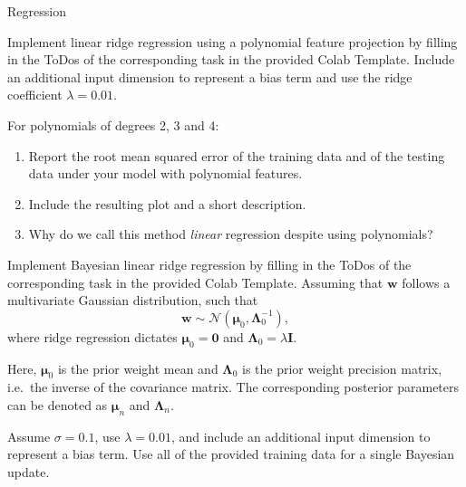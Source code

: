 \documentclass[
	english,
        solution=true
	]{tudaexercise}
\begin{document}
\begin{task}[points=34]{Regression}
\begin{subtask}[points=8, title=Linear Features]
\begin{solution}

\end{solution}

\end{subtask}

\begin{subtask}[points=8, title=Polynomial Features]
Implement linear ridge regression using a polynomial feature projection by filling in the ToDos of the corresponding task in the provided Colab Template.
Include an additional input dimension to represent a bias term and use the ridge coefficient $\lambda = 0.01$.

For polynomials of degrees 2, 3 and 4:
\begin{enumerate}
\item Report the root mean squared error of the training data and of the testing data under your model with polynomial features.
\item Include the resulting plot and a short description.
\item Why do we call this method \textit{linear} regression despite using polynomials?
\end{enumerate}

\begin{solution}

\end{solution}
\end{subtask}


\begin{subtask}[points=10, title=Bayesian Linear Regression]
Implement Bayesian linear ridge regression by filling in the ToDos of the corresponding task in the provided Colab Template. Assuming that $\mathbf{w}$ follows a multivariate Gaussian distribution, such that
\begin{equation*}
\mathbf{w} \sim \mathcal{N}(\bm{\mu}_0, \bm{\Lambda}_0^{-1}),
\end{equation*}
where ridge regression dictates $\bm{\mu}_0 = \mathbf{0}$ and $\bm{\Lambda}_0 = \lambda \mathbf{I}$.

Here, $\bm{\mu}_0$ is the prior weight mean and $\bm{\Lambda}_0$ is the prior weight precision matrix, i.e.~the inverse of the covariance matrix.
The corresponding posterior parameters can be denoted as $\bm{\mu}_n$ and $\bm{\Lambda}_n$.

Assume $\sigma = 0.1$, use $\lambda = 0.01$, and
include an additional input dimension to represent a bias term.
Use all of the provided training data for a single Bayesian update.


\end{subtask}
\end{task}
\end{document}
